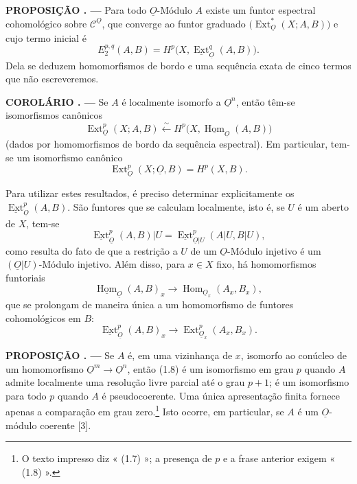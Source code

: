 \documentclass[11pt,twoside,openany]{book}
\numberwithin{equation}{section}
\newcommand{\Osh}{\underline{O}}
\newcommand{\Ccat}{\mathcal C}
\newcommand{\Homsh}{\underline{\operatorname{Hom}}}
\newcommand{\Extsh}{\underline{\operatorname{Ext}}}
\newcommand{\fquote}[1]{\textquotedbl#1\textquotedbl}
\theoremstyle{plain}
\theoremstyle{definition}
\theoremstyle{remark}
\newcommand{\result}[2]{%
  \par\medskip\noindent\textbf{#1%
  \if\relax\detokenize{#2}\relax\else\space#2\fi. ---}\enspace
}
\begin{document}
\result{PROPOSIÇÃO}{1} Para todo $\Osh$-Módulo $A$ existe um funtor
espectral cohomológico sobre $\Ccat^{\Osh}$, que converge ao funtor graduado
$\bigl(\operatorname{Ext}_{\Osh}^{*}(X;A,B)\bigr)$ e cujo termo inicial é
\begin{equation}\tag{1.4}
  E_{2}^{p,q}(A,B)=H^{p}\bigl(X,\Extsh_{\Osh}^{q}(A,B)\bigr).
\end{equation}
Dela se deduzem \fquote{homomorfismos de bordo} e uma sequência exata de cinco termos
que não escreveremos.

\result{COROLÁRIO}{1} Se $A$ é localmente isomorfo a $\Osh^{n}$, então têm-se
isomorfismos canônicos
\begin{equation}\tag{1.5}
  \operatorname{Ext}_{\Osh}^{p}(X;A,B)
  \overset{\sim}{\longleftarrow}
  H^{p}\bigl(X,\Homsh_{\Osh}(A,B)\bigr)
\end{equation}
(dados por homomorfismos de bordo da sequência espectral). Em particular, tem-se
um isomorfismo canônico
\begin{equation}\tag{1.6}
  \operatorname{Ext}_{\Osh}^{p}(X;\Osh,B)=H^{p}(X,B).
\end{equation}

Para utilizar estes resultados, é preciso determinar explicitamente os
$\Extsh_{\Osh}^{p}(A,B)$. São funtores que se calculam localmente,
isto é, se $U$ é um aberto de $X$, tem-se
\[
  \Extsh_{\Osh}^{p}(A,B)|U
  =\Extsh_{\Osh|U}^{p}(A|U,B|U),
\]
como resulta do fato de que a restrição a $U$ de um $\Osh$-Módulo injetivo
é um $(\Osh|U)$-Módulo injetivo. Além disso, para $x\in X$ fixo, há homomorfismos funtoriais
\begin{equation}\tag{1.7}
  \Homsh_{\Osh}(A,B)_x
  \longrightarrow
  \operatorname{Hom}_{\Osh_x}(A_x,B_x),
\end{equation}
que se prolongam de maneira única a um homomorfismo de funtores cohomológicos
em $B$:
\begin{equation}\tag{1.8}
  \Extsh_{\Osh}^{p}(A,B)_x
  \longrightarrow
  \operatorname{Ext}_{\Osh_x}^{p}(A_x,B_x).
\end{equation}

\result{PROPOSIÇÃO}{2} Se $A$ é, em uma vizinhança de $x$, isomorfo ao
conúcleo de um homomorfismo $\Osh^{m}\longrightarrow\Osh^{n}$, então (1.8) é um isomorfismo em grau $p$ quando $A$ admite localmente uma resolução livre parcial até o grau $p+1$; é um isomorfismo para todo $p$ quando $A$ é pseudocoerente. Uma única apresentação finita fornece apenas a comparação em grau zero.\footnote{O texto impresso diz « (1.7) »; a
presença de $p$ e a frase anterior exigem « (1.8) ».} Isto ocorre, em
particular, se $A$ é um $\Osh$-módulo coerente [3].
\end{document}
